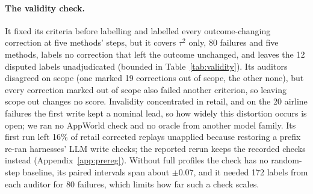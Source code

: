 \documentclass[11pt]{article}
\begin{document}
\paragraph{The validity check.} It fixed its criteria before labelling and labelled every outcome-changing correction at five methods' steps, but it covers $\tau^2$ only, 80 failures and five methods, labels no correction that left the outcome unchanged, and leaves the 12 disputed labels unadjudicated (bounded in Table~\ref{tab:validity}). Its auditors disagreed on scope (one marked 19 corrections out of scope, the other none), but every correction marked out of scope also failed another criterion, so leaving scope out changes no score. Invalidity concentrated in retail, and on the 20 airline failures the first write kept a nominal lead, so how widely this distortion occurs is open; we ran no AppWorld check and no oracle from another model family. Its first run left 16\% of retail corrected replays unapplied because restoring a prefix re-ran harnesses' LLM write checks; the reported rerun keeps the recorded checks instead (Appendix~\ref{app:prereg}). Without full profiles the check has no random-step baseline, its paired intervals span about $\pm0.07$, and it needed 172 labels from each auditor for 80 failures, which limits how far such a check scales.
\end{document}

